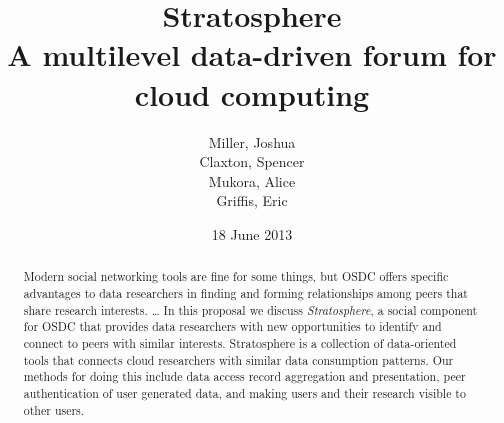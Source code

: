 

\usepackage{titlesec}
\titleformat{\subsection}[hang]{\centering\bfseries}{}{1em}{}

\title{
  Stratosphere \\ 
  \small{A multilevel data-driven forum for cloud computing}
} 

\author{
  Miller, Joshua \\
  Claxton, Spencer \\
  Mukora, Alice \\
  Griffis, Eric
}

\date{\small{18 June 2013}}

\newcommand\XXX[1]{{\color{red} #1}}



\maketitle

\begin{abstract}

  \XXX{Modern social networking tools are fine for some things, but
OSDC offers specific advantages to data researchers in finding and
forming relationships among peers that share research
interests. \ldots} In this proposal we discuss \emph{Stratosphere}, a
social component for OSDC that provides data researchers with new
opportunities to identify and connect to peers with similar interests.
Stratosphere is a collection of data-oriented tools that connects
cloud researchers with similar data consumption patterns. Our methods
for doing this include data access record aggregation and
presentation, peer authentication of user generated data, and making
users and their research visible to other users.


\end{abstract}

